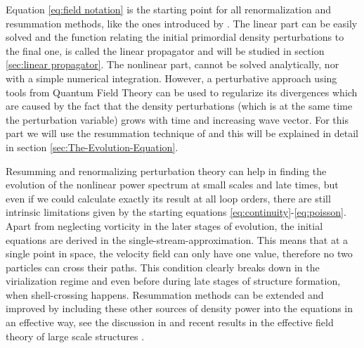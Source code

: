 




Equation \ref{eq:field notation} is the starting point for all renormalization
and resummation methods, like the ones introduced by \cite{crocce_renormalized_2005,bernardeau_evolution_2013,bernardeau_constructing_2012,
	valageas_matter_2013,anselmi_nonlinear_2012,anselmi_next--leading_2010}.
The linear part can be easily solved and the function relating the
initial primordial density perturbations to the final one, is called
the linear propagator and will be studied in section \ref{sec:linear propagator}.
The nonlinear part, cannot be solved analytically, nor with a simple
numerical integration.
However, a perturbative approach using tools from Quantum Field Theory
can be used to regularize its divergences which are caused by the
fact that the density perturbations (which is at the same time the
perturbation variable) grows with time and increasing wave vector.
For this part we will use the resummation technique of \cite{anselmi_nonlinear_2012}
and this will be explained in detail in section \ref{sec:The-Evolution-Equation}.

Resumming and renormalizing perturbation theory can help in finding the evolution
of the nonlinear power spectrum at small scales and late times, but
even if we could calculate exactly its result at all loop orders,
there are still intrinsic limitations given by the starting equations
\ref{eq:continuity}-\ref{eq:poisson}. Apart from neglecting vorticity
in the later stages of evolution, the initial equations are derived
in the single-stream-approximation. This means that at a single point
in space, the velocity field can only have one value, therefore no two particles
can cross their paths. This condition clearly breaks
down in the virialization regime and even before during late stages of structure formation, when
shell-crossing happens. 
Resummation methods
can be extended and improved by including these other sources of density
power into the equations in an effective way, see the discussion in
\cite{manzotti_coarse_2014,pietroni_coarse-grained_2011} and recent
results in the effective field theory of large scale structures \cite{baumann_cosmological_2012,pajer_renormalization_2013,senatore_ir-resummed_2014,carrasco_effective_2012}.

